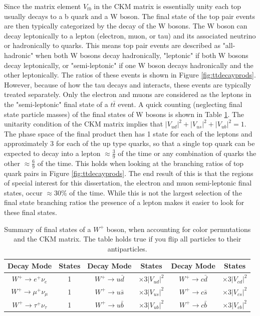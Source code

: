Since the matrix element $V_{tb}$ in the CKM matrix is essentially unity each top usually decays to a b quark and a W boson.  The final state of the top pair events are then typically categorized by the decay of the W bosons.  The W boson can decay leptonically to a lepton (electron, muon, or tau) and its associated neutrino or hadronically to quarks.  This means top pair events are described as "all-hadronic" when both W bosons decay hadronically, "leptonic" if both W bosons decay leptonically, or "semi-leptonic" if one W boson decays hadronically and the other leptonically.  The ratios of these events is shown in Figure \ref{fig:ttdecayprods}.  However, because of how the tau decays and interacts, these events are typically treated separately.  Only the electron and muons are considered as the leptons in the "semi-leptonic" final state of a $t\bar{t}$ event.  A quick counting (neglecting final state particle masses) of the final states of W bosons  is shown in Table \ref{tab:WFinals}.  The unitarity condition of the CKM matrix implies that $|V_{ud}|^2 + |V_{us}|^2 + |V_{ub}|^2 =1$.  The phase space of the final product then has 1 state for each of the leptons and approximately 3 for each of the up type quarks, so that a single top quark can be expected to decay into a lepton $\approx \frac{3}{9}$ of the time or any combination of quarks the other $\approx \frac{6}{9}$ of the time.  This holds when looking at the branching ratios of top quark pairs in Figure \ref{fig:ttdecayprods}.  The end result of this is that the regions of special interest for this dissertation, the electron and muon semi-leptonic final states, occur $\approx 30\%$ of the time.  While this is not the largest selection of the final state branching ratios the presence of a lepton makes it easier to look for these final states.

\begin{table}[]
\begin{center}
\begin{tabular}{|c|c|c|c|c|c|}
 \hline 
Decay Mode           			        & States   & Decay Mode                             &  States			   &     Decay Mode 		 	   &     States                          \\   \hline
$W^+ \rightarrow e^+ \nu_e$ 	        &1          &   $W^+ \rightarrow u\bar{d}$   &  $\times 3 |V_{ud}|^2$  &   $W^+ \rightarrow c\bar{d}$  &   $\times 3 |V_{cd}|^2$\\
$W^+ \rightarrow \mu^+ \nu_\mu$   &1          &  $W^+ \rightarrow u\bar{s}$    &  $\times 3 |V_{us}|^2$   &   $W^+ \rightarrow c\bar{s}$  &    $\times 3 |V_{cs}|^2$\\
$W^+ \rightarrow \tau^+ \nu_\tau$  &1	 &  $W^+ \rightarrow u\bar{b}$    &  $\times 3 |V_{ub}|^2$  &    $W^+ \rightarrow c\bar{b}$ &  $\times 3 |V_{cb}|^2$ \\ \hline
\end{tabular}
	\caption[Summary of final states of a W boson, when accounting for color permutations and the CKM matrix.]{Summary of final states of a $W^+$ boson, when accounting for color permutations and the CKM matrix.  The table holds true if you flip all particles to their antiparticles.}
	\label{tab:WFinals}
\end{center}
\end{table}

